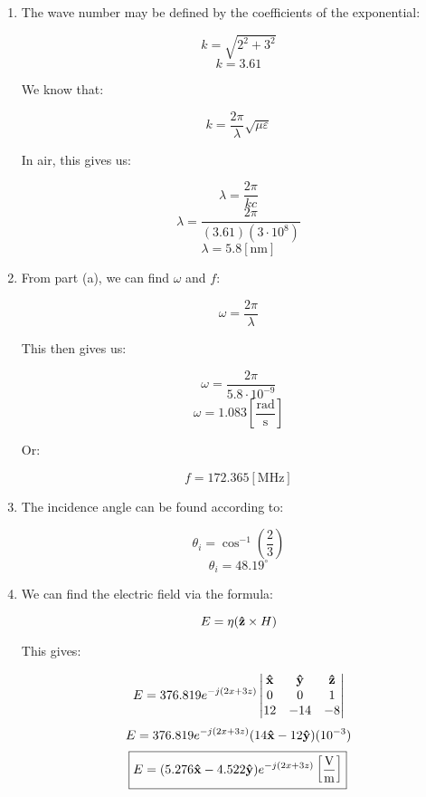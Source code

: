 \begin{enumerate}
    \begin{enumerate}

      \item 

        The wave number may be defined by the coefficients of the exponential:

        $$k=\sqrt{2^2+3^2}$$
        $$k=3.61$$

        We know that:

        $$k=\frac{2\pi}{\lambda}\sqrt{\mu\varepsilon}$$

        In air, this gives us:

        $$\lambda=\frac{2\pi}{kc}$$
        $$\lambda=\frac{2\pi}{(3.61)(3\cdot10^8)}$$
        $$\boxed{\lambda=5.8[\si{\nano\meter}]}$$

      \item 

        From part (a), we can find $\omega$ and $f$:

        $$\omega=\frac{2\pi}{\lambda}$$

        This then gives us:

        $$\omega=\frac{2\pi}{5.8\cdot10^{-9}}$$
        $$\boxed{\omega=1.083\left[ \frac{\text{rad}}{\si{\second}} \right]}$$

        Or:

        $$\boxed{f=172.365\left[ \si{\mega\hertz} \right]}$$


      \item 

        The incidence angle can be found according to:

        $$\theta_i=\cos^{-1}\left( \frac{2}{3} \right)$$
        $$\boxed{\theta_i=48.19^{\circ}}$$

      \item 

        We can find the electric field via the formula:

        $$E=\eta(\bold{\hat{z}}\times H)$$

        This gives:

        $$E=376.819e^{-j(2x+3z)}\left|\begin{matrix}\bold{\hat{x}} & \bold{\hat{y}} & \bold{\hat{z}}\\ 0 & 0 & 1\\ 12 & -14 & -8 \end{matrix}\right|$$
        $$E=376.819e^{-j(2x+3z)}(14\bold{\hat{x}}-12\bold{\hat{y}})(10^{-3})$$
        $$\boxed{E=(5.276\bold{\hat{x}}-4.522\bold{\hat{y}})e^{-j(2x+3z)}\left[ \frac{\si{\volt}}{\si{\meter}} \right]}$$


\end{enumerate}
\end{enumerate}
